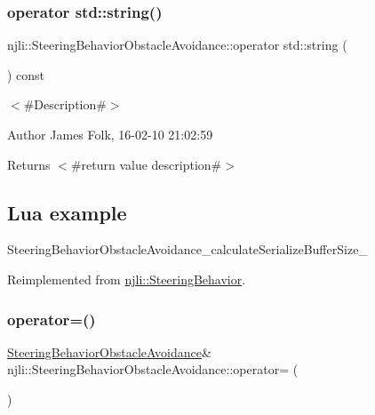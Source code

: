 \subsubsection{\texorpdfstring{operator std\+::string()}{operator std::string()}}
{\footnotesize\ttfamily njli\+::\+Steering\+Behavior\+Obstacle\+Avoidance\+::operator std\+::string (\begin{DoxyParamCaption}{ }\end{DoxyParamCaption}) const\hspace{0.3cm}{\ttfamily [virtual]}}



$<$\#\+Description\#$>$ 

\begin{DoxyAuthor}{Author}
James Folk, 16-\/02-\/10 21\+:02\+:59
\end{DoxyAuthor}
\begin{DoxyReturn}{Returns}
$<$\#return value description\#$>$
\end{DoxyReturn}
\hypertarget{classnjli_1_1_steering_behavior_wander_ex1}{}\subsection{Lua example}\label{classnjli_1_1_steering_behavior_wander_ex1}

\begin{DoxyCodeInclude}
\end{DoxyCodeInclude}
Steering\+Behavior\+Obstacle\+Avoidance\+\_\+calculate\+Serialize\+Buffer\+Size\+\_\+ 

Reimplemented from \mbox{\hyperlink{classnjli_1_1_steering_behavior_acd7af46e42a8a3fc1208a47f50836ac8}{njli\+::\+Steering\+Behavior}}.

\mbox{\label{classnjli_1_1_steering_behavior_obstacle_avoidance_aee0cca003e0d184762ef89d4adda8278}} 
\subsubsection{\texorpdfstring{operator=()}{operator=()}}
{\footnotesize\ttfamily \mbox{\hyperlink{classnjli_1_1_steering_behavior_obstacle_avoidance}{Steering\+Behavior\+Obstacle\+Avoidance}}\& njli\+::\+Steering\+Behavior\+Obstacle\+Avoidance\+::operator= (\begin{DoxyParamCaption}\item[{const \mbox{\hyperlink{classnjli_1_1_steering_behavior_obstacle_avoidance}{Steering\+Behavior\+Obstacle\+Avoidance}} \&}]{ }\end{DoxyParamCaption})\hspace{0.3cm}{\ttfamily [protected]}}

